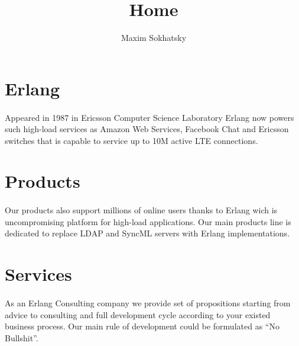 \documentclass[11pt]{article}
\begin{document}

\title{Home}
\author{Maxim Sokhatsky}


\section*{Erlang}
\paragraph{}
Appeared in 1987 in Ericsson Computer Science Laboratory
Erlang now powers such high-load services as Amazon Web Services, Facebook Chat
and Ericsson switches that is capable to service up to 10M active LTE connections.


\section*{Products}
\paragraph{}
Our products also support millions of online users thanks to Erlang wich
is uncompromising platform for high-load applications. Our main products line is dedicated
to replace LDAP and SyncML servers with Erlang implementations.

\section*{Services}
\paragraph{}
As an Erlang Consulting company we provide set of propositions starting from advice to
consulting and full development cycle according to your existed business process.
Our main rule of development could be formulated as ``No Bullshit''.
\end{document}
